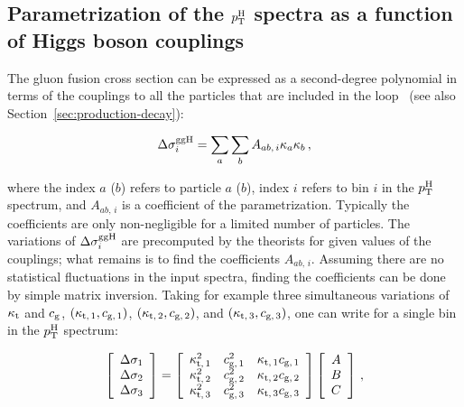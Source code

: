 \subsection{Parametrization of the \texorpdfstring{$p_\mathrm{T}^\mathrm{H}$}{pTH} spectra as a function of Higgs boson couplings}


The gluon fusion cross section can be expressed as a second-degree polynomial in terms of the couplings to all the particles that are included in the loop~\cite{higgshunter} (see also Section~\ref{sec:production-decay}):
% 
\begin{linenomath*}
\begin{equation}
\label{eq:kappa-parametrization}
\Delta\sigma^{\mathrm{g}\mathrm{g}\mathrm{H}}_i = \sum_a \sum_b A_{ab,\,i} \kappa_a \kappa_b 
\,,
\end{equation}
\end{linenomath*}
% 
where the index $a$ ($b$) refers to particle $a$ ($b$), index $i$ refers to bin $i$ in the $p_\mathrm{T}^\mathrm{H}$ spectrum, and $A_{ab,\,i}$ is a coefficient of the parametrization.
% 
Typically the coefficients are only non-negligible for a limited number of particles.
% 
The variations of $\Delta\sigma^{\mathrm{g}\mathrm{g}\mathrm{H}}_i$ are precomputed by the theorists for given values of the couplings; what remains is to find the coefficients $A_{ab,\,i}$.
% 
Assuming there are no statistical fluctuations in the input spectra, finding the coefficients can be done by simple matrix inversion.
% 
Taking for example three simultaneous variations of $\kappa_{\mathrm{t}}$ and $c_\mathrm{g}$, $(\kappa_{\mathrm{t},\,1}, c_{\mathrm{g},\,1})$, $(\kappa_{\mathrm{t},\,2}, c_{\mathrm{g},\,2})$, and $(\kappa_{\mathrm{t},\,3}, c_{\mathrm{g},\,3})$, one can write for a single bin in the $p_\mathrm{T}^\mathrm{H}$ spectrum:
% 
\begin{linenomath*}
\begin{equation}
\left[\begin{array}{c}
\Delta\sigma_1 \\
\Delta\sigma_2 \\
\Delta\sigma_3
\end{array}\right]
    =
    \left[\begin{array}{ccc}
        \kappa_{\mathrm{t},\,1}^2  &  c_{\mathrm{g},\,1}^2   &  \kappa_{\mathrm{t},\,1} c_{\mathrm{g},\,1} \\
        \kappa_{\mathrm{t},\,2}^2  &  c_{\mathrm{g},\,2}^2   &  \kappa_{\mathrm{t},\,2} c_{\mathrm{g},\,2} \\
        \kappa_{\mathrm{t},\,3}^2  &  c_{\mathrm{g},\,3}^2   &  \kappa_{\mathrm{t},\,3} c_{\mathrm{g},\,3}
        \end{array}\right]
    \left[\begin{array}{c}
        A \\
        B \\
        C
        \end{array}\right]
    \,,
\end{equation}
\end{linenomath*}
